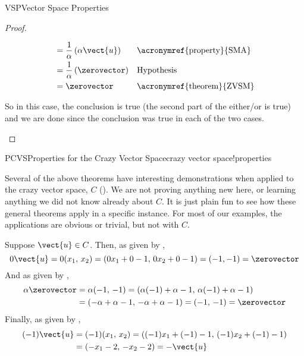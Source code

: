 \begin{subsect}{VSP}{Vector Space Properties}
\begin{proof}
\begin{para}
\begin{align*}
%
&=\frac{1}{\alpha}\left(\alpha\vect{u}\right)
&&\text{\acronymref{property}{SMA}}\\
%
&=\frac{1}{\alpha}\left(\zerovector\right)
&&\text{Hypothesis}\\
%
&=\zerovector&&\text{\acronymref{theorem}{ZVSM}}
%
\end{align*}\end{para}
%
\begin{para}So in this case, the conclusion is true (the second part of the either/or is true) and we are done since the conclusion was true in each of the two cases.\end{para}
%
\end{proof}
%
\begin{example}{PCVS}{Properties for the Crazy Vector Space}{crazy vector space!properties}
\begin{para}Several of the above theorems have interesting demonstrations when applied to the crazy vector space, $C$ ().  We are not proving anything new here, or learning anything we did not know already about $C$.  It is just plain fun to see how these general theorems apply in a specific instance.  For most of our examples, the applications are obvious or trivial, but not with $C$.\end{para}
%
\begin{para}Suppose $\vect{u}\in C$.  Then, as given by ,
%
\begin{equation*}
0\vect{u}=0(x_1,\,x_2)=(0x_1+0-1,\,0x_2+0-1)=(-1,-1)=\zerovector
\end{equation*}
%
And as given by ,
%
\begin{align*}
\alpha\zerovector
&=\alpha(-1,\,-1)=(\alpha(-1)+\alpha-1,\,\alpha(-1)+\alpha-1)\\
&=(-\alpha+\alpha-1,\,-\alpha+\alpha-1)=(-1,\,-1)=\zerovector
\end{align*}
%
Finally, as given by ,
%
\begin{align*}
(-1)\vect{u}
&=(-1)(x_1,\,x_2)=((-1)x_1+(-1)-1,\,(-1)x_2+(-1)-1)\\
&=(-x_1-2,\,-x_2-2)=-\vect{u}
\end{align*}
\end{para}
%
\end{example}
%
\end{subsect}
%
